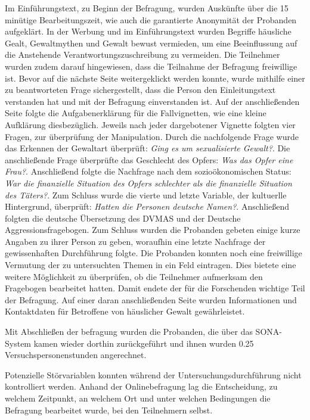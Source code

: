 Im Einführungstext, zu Beginn der Befragung, wurden Auskünfte über die 15 minütige Bearbeitungszeit, wie auch die garantierte Anonymität der Probanden aufgeklärt. In der Werbung und im Einführungstext wurden Begriffe häusliche Gealt, Gewaltmythen und Gewalt bewust vermieden, um eine Beeinflussung auf die Anstehende Verantwortungszuschreibung zu vermeiden. Die Teilnehmer wurden zudem darauf hingewiesen, dass die Teilnahme der Befragung freiwillige ist. Bevor auf die nächste Seite weitergeklickt werden konnte, wurde mithilfe einer zu beantworteten Frage sichergestellt, dass die Person den Einleitungstext verstanden hat und mit der Befragung einverstanden ist. Auf der anschließenden Seite folgte die Aufgabenerklärung für die Fallvignetten, wie eine kleine Aufklärung diesbezüglich. Jeweils nach jeder dargebotener Vignette folgten vier Fragen, zur überprüfung der Manipulation. Durch die nachfolgende Frage wurde das Erkennen der Gewaltart überprüft: \textit{Ging es um sexualisierte Gewalt?}. Die anschließende Frage überprüfte das Geschlecht des Opfers: \textit{Was das Opfer eine Frau?}. Anschließend folgte die Nachfrage nach dem sozioökonomischen Status: \textit{War die finanzielle Situation des Opfers schlechter als die finanzielle Situation des Täters?}. Zum Schluss wurde die vierte und letzte Variable, der kultuerlle Hintergrund, überprüft: \textit{Hatten die Personen deutsche Namen?}. Anschließend folgten die deutsche Übersetzung des DVMAS und der Deutsche Aggressionsfragebogen. Zum Schluss wurden die Probanden gebeten einige kurze Angaben zu ihrer Person zu geben, woraufhin eine letzte Nachfrage der gewissenhaften Durchführung folgte. Die Probanden konnten noch eine freiwillige Vermutung der zu untersuchten Themen in ein Feld eintragen. Dies bietete eine weitere Möglichkeit zu überprüfen, ob die Teilnehmer aufmerksam den Fragebogen bearbeitet hatten. Damit endete der für die Forschenden wichtige Teil der Befragung. Auf einer daran anschließenden Seite wurden Informationen und Kontaktdaten für Betroffene von häuslicher Gewalt gewährleistet. 

Mit Abschließen der befragung wurden die Probanden, die über das SONA-System kamen wieder dorthin zurückgeführt und ihnen wurden 0.25 Versuchspersonenstunden angerechnet.

Potenzielle Störvariablen konnten während der Untersuchungsdurchführung nicht kontrolliert werden. Anhand der Onlinebefragung lag die Entscheidung, zu welchem Zeitpunkt, an welchem Ort und unter welchen Bedingungen die Befragung bearbeitet wurde, bei den Teilnehmern selbst.


